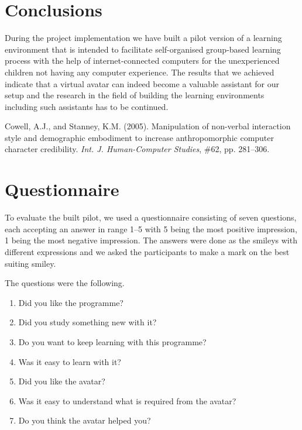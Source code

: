 \documentclass[a4paper]{article}
\begin{document}
\section{Conclusions}

During the project implementation we have built a pilot version of a learning environment that is intended to facilitate self-organised group-based learning process with the help of internet-connected computers for the unexperienced children not having any computer experience. The results that we achieved indicate that a virtual avatar can indeed become a valuable assistant for our setup and the research in the field of building the learning environments including such assistants has to be continued.

\begin{thebibliography}{99}
 Cowell, A.J., and Stanney, K.M. (2005). Manipulation of non-verbal interaction style and demographic embodiment to increase anthropomorphic computer character credibility. \emph{Int. J. Human-Computer Studies}, \#62,  pp. 281--306.
\end{thebibliography}

\appendix

\newpage

\section{Questionnaire}

To evaluate the built pilot, we used a questionnaire consisting of seven questions, each accepting an answer in range 1--5 with 5 being the most positive impression, 1 being the most negative impression. The answers were done as the smileys with different expressions and we asked the participants to make a mark on the best suiting smiley.

The questions were the following.

\begin{enumerate}
	\item Did you like the programme?
	\item Did you study something new with it?
	\item Do you want to keep learning with this programme? 
	\item Was it easy to learn with it?
	\item Did you like the avatar?
	\item Was it easy to understand what is required from the avatar?
	\item Do you think the avatar helped you?
\end{enumerate}
\end{document}
